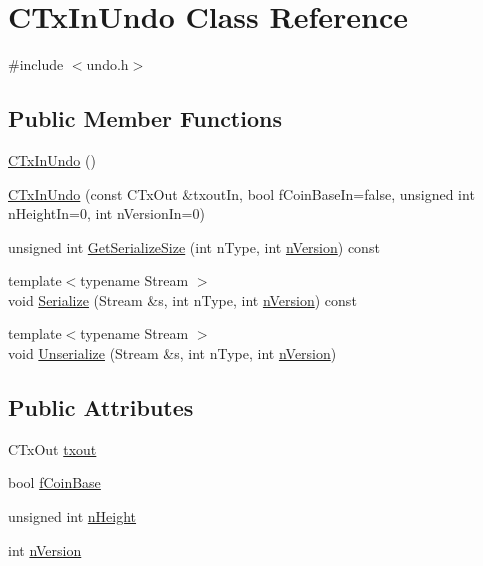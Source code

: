 \hypertarget{class_c_tx_in_undo}{}\section{C\+Tx\+In\+Undo Class Reference}
\label{class_c_tx_in_undo}


{\ttfamily \#include $<$undo.\+h$>$}

\subsection*{Public Member Functions}
\begin{DoxyCompactItemize}
\item 
\mbox{\hyperlink{class_c_tx_in_undo_a9f8d4a16f1cb14fcec729becdb944003}{C\+Tx\+In\+Undo}} ()
\item 
\mbox{\hyperlink{class_c_tx_in_undo_a9f4da076d789bf5fa3f6d8d4b1d7d6fd}{C\+Tx\+In\+Undo}} (const C\+Tx\+Out \&txout\+In, bool f\+Coin\+Base\+In=false, unsigned int n\+Height\+In=0, int n\+Version\+In=0)
\item 
unsigned int \mbox{\hyperlink{class_c_tx_in_undo_ae02e42aeabd614a26ba5657f60ec6921}{Get\+Serialize\+Size}} (int n\+Type, int \mbox{\hyperlink{class_c_tx_in_undo_a193281289475ca792e436a7a02de23ef}{n\+Version}}) const
\item 
{\footnotesize template$<$typename Stream $>$ }\\void \mbox{\hyperlink{class_c_tx_in_undo_a7a4e1cf026b5308fdca471bada9cebaf}{Serialize}} (Stream \&s, int n\+Type, int \mbox{\hyperlink{class_c_tx_in_undo_a193281289475ca792e436a7a02de23ef}{n\+Version}}) const
\item 
{\footnotesize template$<$typename Stream $>$ }\\void \mbox{\hyperlink{class_c_tx_in_undo_a0a2b82f03edad7ad85a66e63e4552af9}{Unserialize}} (Stream \&s, int n\+Type, int \mbox{\hyperlink{class_c_tx_in_undo_a193281289475ca792e436a7a02de23ef}{n\+Version}})
\end{DoxyCompactItemize}
\subsection*{Public Attributes}
\begin{DoxyCompactItemize}
\item 
C\+Tx\+Out \mbox{\hyperlink{class_c_tx_in_undo_a0eb1374984b5b68b0af14d88d7d4b821}{txout}}
\item 
bool \mbox{\hyperlink{class_c_tx_in_undo_a5952f917224de3a2193157b856c47864}{f\+Coin\+Base}}
\item 
unsigned int \mbox{\hyperlink{class_c_tx_in_undo_af022118f015a9b1b9ab96e04e8452292}{n\+Height}}
\item 
int \mbox{\hyperlink{class_c_tx_in_undo_a193281289475ca792e436a7a02de23ef}{n\+Version}}
\end{DoxyCompactItemize}


